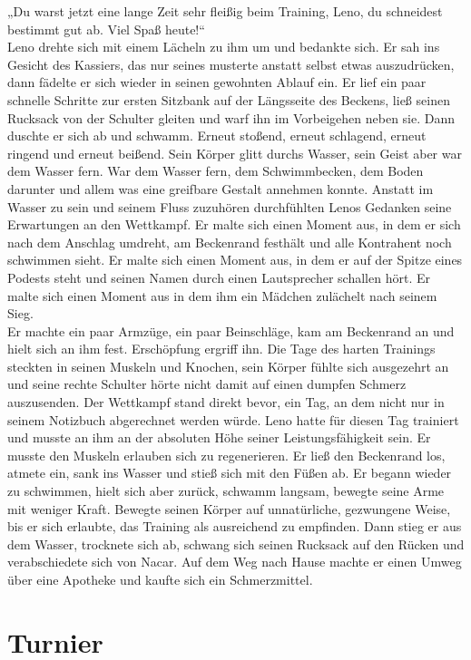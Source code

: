 \documentclass[ngerman,smalldemyvopaper,11pt,oneside,onecolumn,openright,extrafontsizes]{memoir}
\begin{document}
„Du warst jetzt eine lange Zeit sehr fleißig beim Training, Leno, du schneidest bestimmt gut ab. Viel Spaß heute!“\\
Leno drehte sich mit einem Lächeln zu ihm um und bedankte sich. Er sah ins Gesicht des Kassiers, das nur seines musterte anstatt selbst etwas auszudrücken, dann fädelte er sich wieder in seinen gewohnten Ablauf ein. Er lief ein paar schnelle Schritte zur ersten Sitzbank auf der Längsseite des Beckens, ließ seinen Rucksack von der Schulter gleiten und warf ihn im Vorbeigehen neben sie. Dann duschte er sich ab und schwamm. Erneut stoßend, erneut schlagend, erneut ringend und erneut beißend. Sein Körper glitt durchs Wasser, sein Geist aber war dem Wasser fern. War dem Wasser fern, dem Schwimmbecken, dem Boden darunter und allem was eine greifbare Gestalt annehmen konnte. Anstatt im Wasser zu sein und seinem Fluss zuzuhören durchfühlten Lenos Gedanken seine Erwartungen an den Wettkampf. Er malte sich einen Moment aus, in dem er sich nach dem Anschlag umdreht, am Beckenrand festhält und alle Kontrahent noch schwimmen sieht. Er malte sich einen Moment aus, in dem er auf der Spitze eines Podests steht und seinen Namen durch einen Lautsprecher schallen hört. Er malte sich einen Moment aus in dem ihm ein Mädchen zulächelt nach seinem Sieg.
\vspace{0.5em} \\
Er machte ein paar Armzüge, ein paar Beinschläge, kam am Beckenrand an und hielt sich an ihm fest. Erschöpfung ergriff ihn. Die Tage des harten Trainings steckten in seinen Muskeln und Knochen, sein Körper fühlte sich ausgezehrt an und seine rechte Schulter hörte nicht damit auf einen dumpfen Schmerz auszusenden. Der Wettkampf stand direkt bevor, ein Tag, an dem nicht nur in seinem Notizbuch abgerechnet werden würde. Leno hatte für diesen Tag trainiert und musste an ihm an der absoluten Höhe seiner Leistungsfähigkeit sein. Er musste den Muskeln erlauben sich zu regenerieren. Er ließ den Beckenrand los, atmete ein, sank ins Wasser und stieß sich mit den Füßen ab. Er begann wieder zu schwimmen, hielt sich aber zurück, schwamm langsam, bewegte seine Arme mit weniger Kraft. Bewegte seinen Körper auf unnatürliche, gezwungene Weise, bis er sich erlaubte, das Training als ausreichend zu empfinden. Dann stieg er aus dem Wasser, trocknete sich ab, schwang sich seinen Rucksack auf den Rücken und verabschiedete sich von Nacar. Auf dem Weg nach Hause machte er einen Umweg über eine Apotheke und kaufte sich ein Schmerzmittel.
\chapter{Turnier}
\end{document}
